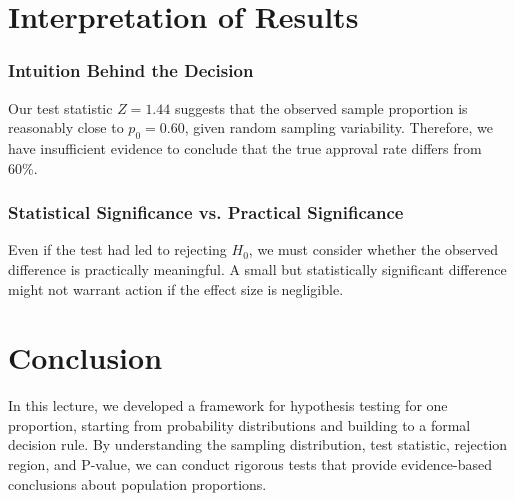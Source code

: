 \documentclass[11pt]{article}
\begin{document}
\section*{Interpretation of Results}

\subsubsection*{Intuition Behind the Decision}
Our test statistic \( Z = 1.44 \) suggests that the observed sample proportion is reasonably close to \( p_0 = 0.60 \), given random sampling variability. Therefore, we have insufficient evidence to conclude that the true approval rate differs from 60\%.

\subsubsection*{Statistical Significance vs. Practical Significance}
Even if the test had led to rejecting \( H_0 \), we must consider whether the observed difference is practically meaningful. A small but statistically significant difference might not warrant action if the effect size is negligible.

\section*{Conclusion}
In this lecture, we developed a framework for hypothesis testing for one proportion, starting from probability distributions and building to a formal decision rule. By understanding the sampling distribution, test statistic, rejection region, and P-value, we can conduct rigorous tests that provide evidence-based conclusions about population proportions.
\end{document}
